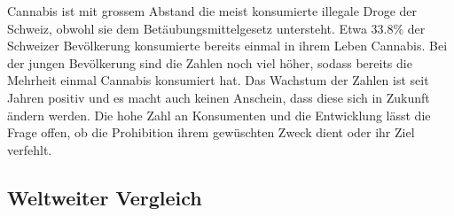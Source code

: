 \documentclass[../main.tex]{subfiles}
\begin{document}
	 \noindent
	 Cannabis ist mit grossem Abstand die meist konsumierte illegale Droge der Schweiz, obwohl sie dem Betäubungsmittelgesetz untersteht. 
	 Etwa $33.8\%$ der Schweizer Bevölkerung \cite{gmel} konsumierte bereits einmal in ihrem Leben Cannabis. 
	 Bei der jungen Bevölkerung sind die Zahlen noch viel höher, sodass bereits die Mehrheit einmal Cannabis konsumiert hat. 
	 Das Wachstum der Zahlen ist seit Jahren positiv und es macht auch keinen Anschein, dass diese sich in Zukunft ändern werden.
	 Die hohe Zahl an Konsumenten und die Entwicklung lässt die Frage offen, ob die Prohibition ihrem gewüschten Zweck dient oder ihr Ziel verfehlt.
	 
	 
	 \subsection{Weltweiter Vergleich}
	 
	 
	
\end{document}
